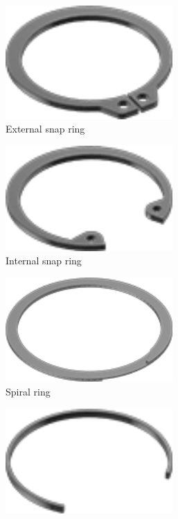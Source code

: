 \begin{figure}[H]
\begin{subfigure}[b]{.24\linewidth}
		\end{subfigure}
		\begin{subfigure}[b]{.24\linewidth}
			\includegraphics[width=0.7\textwidth]{imgs/ext_snapring.png}
			\caption{External snap ring}
		\end{subfigure}
		\begin{subfigure}[b]{.24\linewidth}
			\includegraphics[width=0.7\textwidth]{imgs/int_snapring.png}
			\caption{Internal snap ring}
		\end{subfigure}
		\begin{subfigure}[b]{.24\linewidth}
			\includegraphics[width=0.7\textwidth]{imgs/spiralring.png}
			\caption{Spiral ring}
		\end{subfigure}\begin{subfigure}[b]{.24\linewidth}
			\includegraphics[width=0.7\textwidth]{imgs/circlip.png}

\end{subfigure}
\end{figure}
